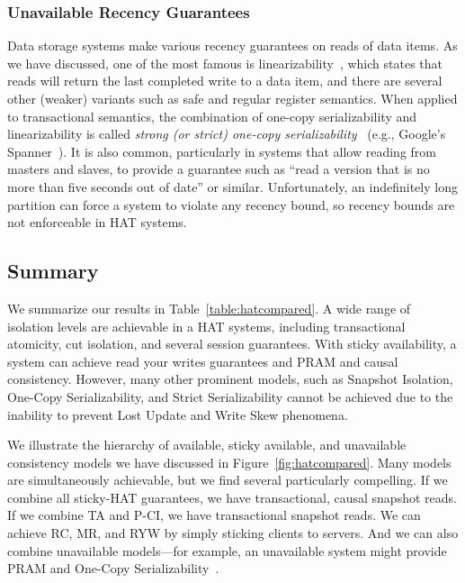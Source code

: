 \subsubsection{Unavailable Recency Guarantees}

Data storage systems make various recency guarantees on reads of data
items. As we have discussed, one of the most famous is
linearizability~\cite{herlihy-art}, which states that reads will
return the last completed write to a data item, and there are several
other (weaker) variants such as safe and regular register
semantics. When applied to transactional semantics, the combination of
one-copy serializability and linearizability is called \textit{strong
  (or strict) one-copy serializability}~\cite{adya} (e.g., Google's
Spanner~\cite{spanner}). It is also common, particularly in systems
that allow reading from masters and slaves, to provide a guarantee
such as ``read a version that is no more than five seconds out of
date'' or similar. Unfortunately, an indefinitely long partition can
force a system to violate any recency bound, so recency bounds are not
enforceable in HAT systems.

\subsection{Summary}
\label{sec:hat-summary}

We summarize our results in Table~\ref{table:hatcompared}. A wide
range of isolation levels are achievable in a HAT systems, including
transactional atomicity, cut isolation, and several session
guarantees. With sticky availability, a system can achieve read your
writes guarantees and PRAM and causal consistency. However, many other
prominent models, such as Snapshot Isolation, One-Copy
Serializability, and Strict Serializability cannot be achieved due to
the inability to prevent Lost Update and Write Skew phenomena.

We illustrate the hierarchy of available, sticky available, and
unavailable consistency models we have discussed in
Figure~\ref{fig:hatcompared}. Many models are simultaneously
achievable, but we find several particularly compelling. If we combine
all sticky-HAT guarantees, we have transactional, causal snapshot
reads. If we combine TA and P-CI, we have transactional snapshot
reads. We can achieve RC, MR, and RYW by simply sticking clients to
servers. And we can also combine unavailable models---for example, an
unavailable system might provide PRAM and One-Copy
Serializability~\cite{daudjee-session}.

